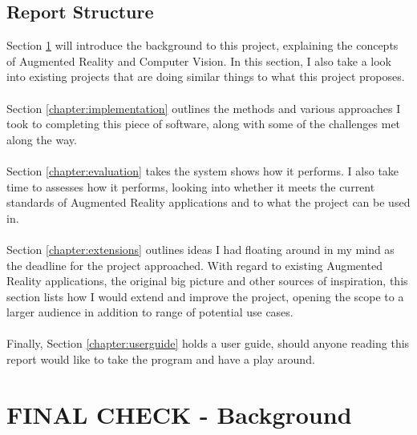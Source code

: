 \documentclass[11pt]{article}
\begin{document}
\subsection{Report Structure}
Section \ref{chapter:background} will introduce the background to this
project, explaining the concepts of Augmented Reality and Computer
Vision. In this section, I also take a look into existing
projects that are doing similar things to what this project proposes.\\
\\
Section \ref{chapter:implementation} outlines the methods and various
approaches I took to completing this piece of software, along with
some of the challenges met along the way.\\
\\
Section \ref{chapter:evaluation} takes the system shows how it performs.
I also take time to assesses how it
performs, looking into whether it meets the current standards of 
Augmented Reality applications and to what the project can be used in.\\
\\
Section \ref{chapter:extensions} outlines ideas I had floating around in my
mind as the deadline for the project approached. With regard to existing
Augmented Reality applications, the original big picture and other
sources of inspiration, this section lists how I would extend and improve
the project, opening the scope to a larger audience in addition to range
of potential use cases.\\
\\
Finally, Section \ref{chapter:userguide} holds a user guide, should anyone
reading this report would like to take the program and have a play around.

\newpage
\section{FINAL CHECK - Background}
\label{chapter:background}
\end{document}
